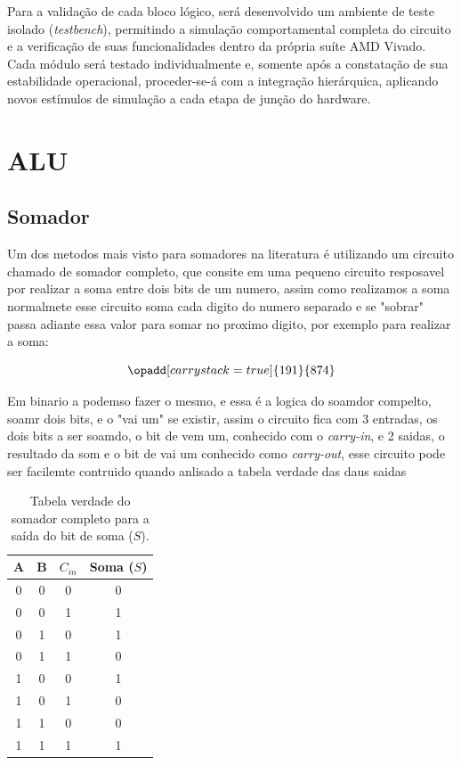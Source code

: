 Para a validação de cada bloco lógico, será desenvolvido um ambiente de teste isolado (\textit{testbench}), permitindo a simulação comportamental completa do circuito e a verificação de suas funcionalidades dentro da própria suíte AMD Vivado. Cada módulo será testado individualmente e, somente após a constatação de sua estabilidade operacional, proceder-se-á com a integração hierárquica, aplicando novos estímulos de simulação a cada etapa de junção do hardware.

\section{ALU}


\subsection{Somador}

Um dos metodos mais visto para somadores na literatura é utilizando um circuito chamado de somador completo, que consite em uma pequeno circuito resposavel por realizar a soma entre dois bits de um numero, assim como realizamos a soma normalmete esse circuito soma cada digito do numero separado e se "sobrar" passa adiante essa valor para somar no proximo digito, por exemplo para realizar a soma: 

\begin{equation}
    \opadd[carrystack=true]{191}{874}
    \label{eq:soma_colunas}
\end{equation}


Em binario a podemso fazer o mesmo, e essa é a logica do soamdor compelto, soamr dois bits, e o "vai um" se existir, assim o circuito fica com 3 entradas, os dois bits a ser soamdo, o bit de vem um, conhecido com o \textit{carry-in}, e 2 saidas, o resultado da som e o bit de vai um conhecido como \textit{carry-out}, esse circuito pode ser facilemte contruido quando anlisado a tabela verdade das daus saidas

\begin{table}[htb]
\centering
\caption{Tabela verdade do somador completo para a saída do bit de soma ($S$).}
\label{tab:fa_soma}
\begin{tabular}{cccc}
\toprule
\textbf{A} & \textbf{B} & \textbf{$C_{in}$} & \textbf{Soma ($S$)} \\
\midrule
0 & 0 & 0 & 0 \\
0 & 0 & 1 & 1 \\
0 & 1 & 0 & 1 \\
0 & 1 & 1 & 0 \\
1 & 0 & 0 & 1 \\
1 & 0 & 1 & 0 \\
1 & 1 & 0 & 0 \\
1 & 1 & 1 & 1 \\
\bottomrule
\end{tabular}
\end{table}

